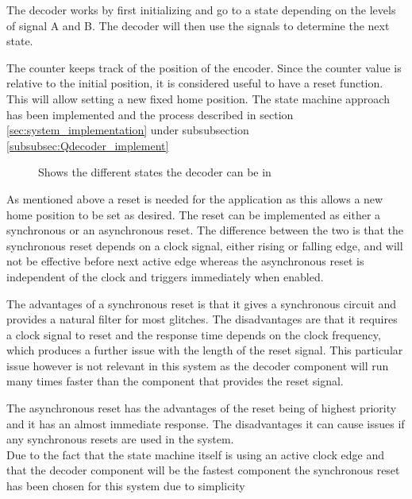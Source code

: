 \documentclass[../../../main]{subfiles}
\begin{document}
The decoder works by first initializing and go to a state depending on the levels of signal A and B. The decoder will then use the signals to determine the next state.

The counter keeps track of the position of the encoder. Since the counter value is relative to the initial position, it is considered useful to have a reset function. This will allow setting a new fixed home position. The state machine approach has been implemented and the process described in section \ref{sec:system_implementation} under subsubsection \ref{subsubsec:Qdecoder_implement}

\begin{figure}[H]
  \centering
  \def\svgwidth{0.7\columnwidth}
  \fontsize{9}{9}\selectfont
  
  \caption{Shows the different states the decoder can be in}
  \label{fig:state_dia}
\end{figure}
As mentioned above a reset is needed for the application as this allows a new home position to be set as desired. The reset can be implemented as either a synchronous or an asynchronous reset. The difference between the two is that the synchronous reset depends on a clock signal, either rising or falling edge, and will not be effective before next active edge whereas the asynchronous reset is independent of the clock and triggers immediately when enabled.


The advantages of a synchronous reset is that it gives a synchronous circuit and provides a natural filter for most glitches. The disadvantages are that it requires a clock signal to reset and the response time depends on the clock frequency, which produces a further issue with the length of the reset signal.
This particular issue however is not relevant in this system as the decoder component will run many times faster than the component that provides the reset signal.

The asynchronous reset has the advantages of the reset being of highest priority and it has an almost immediate response.
The disadvantages it can cause issues if any synchronous resets are used in the system. \\

Due to the fact that the state machine itself is using an active clock edge and that the decoder component will be the fastest component the synchronous reset has been chosen for this system due to simplicity
\end{document}
